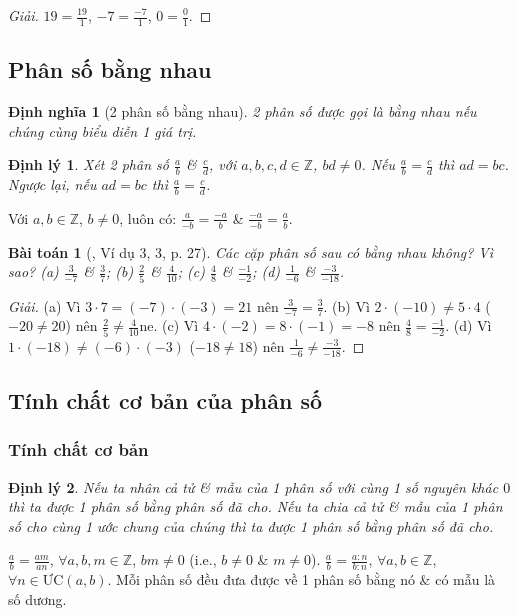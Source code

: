\documentclass{article}
\newtheorem{baitoan}{Bài toán}
\newtheorem{dinhly}{Định lý}
\newtheorem{dinhnghia}{Định nghĩa}
\begin{document}
\begin{proof}[Giải]
	$19 = \frac{19}{1}$, $-7 = \frac{-7}{1}$, $0 = \frac{0}{1}$.
\end{proof}

\subsection{Phân số bằng nhau}

\begin{dinhnghia}[2 phân số bằng nhau]
	2 phân số được gọi là \emph{bằng nhau} nếu chúng cùng biểu diễn 1 giá trị.
\end{dinhnghia}

\begin{dinhly}
	Xét 2 phân số $\frac{a}{b}$ \& $\frac{c}{d}$, với $a,b,c,d\in\mathbb{Z}$, $bd\ne0$. Nếu $\frac{a}{b} = \frac{c}{d}$ thì $ad = bc$. Ngược lại, nếu $ad = bc$ thì $\frac{a}{b} = \frac{c}{d}$.
\end{dinhly}
Với $a,b\in\mathbb{Z}$, $b\ne0$, luôn có: $\frac{a}{-b} = \frac{-a}{b}$ \& $\frac{-a}{-b} = \frac{a}{b}$.

\begin{baitoan}[\cite{SGK_Toan_6_Canh_Dieu_tap_2}, Ví dụ 3, 3, p. 27]
	Các cặp phân số sau có bằng nhau không? Vì sao? (a) $\frac{3}{-7}$ \& $\frac{3}{7}$; (b) $\frac{2}{5}$ \& $\frac{4}{10}$; (c) $\frac{4}{8}$ \& $\frac{-1}{-2}$; (d) $\frac{1}{-6}$ \& $\frac{-3}{-18}$.
\end{baitoan}

\begin{proof}[Giải]
	(a) Vì $3\cdot7 = (-7)\cdot(-3) = 21$ nên $\frac{3}{-7} = \frac{3}{7}$. (b) Vì $2\cdot(-10)\ne5\cdot4$ ($-20\ne20$) nên $\frac{2}{5}\ne\frac{4}{10}$ne. (c) Vì $4\cdot(-2) = 8\cdot(-1) = -8$ nên $\frac{4}{8} = \frac{-1}{-2}$. (d) Vì $1\cdot(-18)\ne(-6)\cdot(-3)$ ($-18\ne18$) nên $\frac{1}{-6}\ne\frac{-3}{-18}$.
\end{proof}

\subsection{Tính chất cơ bản của phân số}

\subsubsection{Tính chất cơ bản}

\begin{dinhly}
	Nếu ta nhân cả tử \& mẫu của 1 phân số với cùng 1 số nguyên khác $0$ thì ta được 1 phân số bằng phân số đã cho. Nếu ta chia cả tử \& mẫu của 1 phân số cho cùng 1 ước chung của chúng thì ta được 1 phân số bằng phân số đã cho.
\end{dinhly}
$\frac{a}{b} = \frac{am}{an}$, $\forall a,b,m\in\mathbb{Z}$, $bm\ne0$ (i.e., $b\ne0$ \& $m\ne0$). $\frac{a}{b} = \frac{a:n}{b:n}$, $\forall a,b\in\mathbb{Z}$, $\forall n\in\mbox{ƯC}(a,b)$. Mỗi phân số đều đưa được về 1 phân số bằng nó \& có mẫu là số dương.
\end{document}
